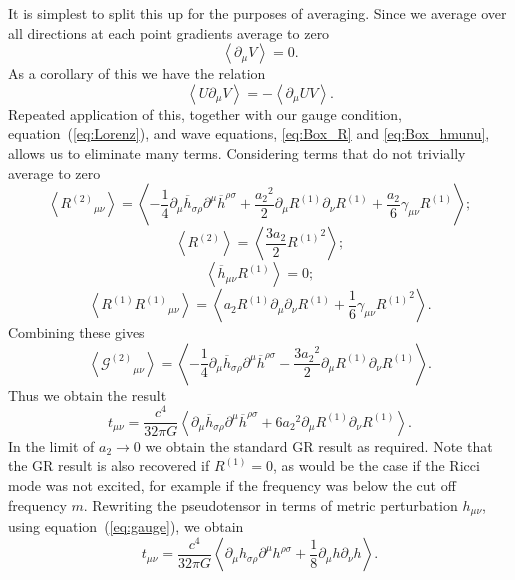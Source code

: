 \documentclass[a4paper, 11pt, titlepage, twoside]{report}
\newcommand{\eqnref}[1]{equation~(\ref{eq:#1})}
\newcommand{\recip}[1]{\ensuremath{\frac{1}{#1}}}
\begin{document}
{It is simplest to split this up for the purposes of averaging. Since we average over all directions at each point gradients average to zero
\begin{equation}
\left\langle\partial_\mu V\right\rangle = 0.
\end{equation}
As a corollary of this we have the relation
\begin{equation}
\left\langle U\partial_\mu V\right\rangle = -\left\langle \partial_\mu U V\right\rangle.
\end{equation}
Repeated application of this, together with our gauge condition, \eqnref{Lorenz}, and wave equations, \eqref{eq:Box_R} and \eqref{eq:Box_hmunu}, allows us to eliminate many terms. Considering terms that do not trivially average to zero
\begin{equation}
\left\langle {R^{(2)}}_{\mu\nu} \right\rangle = \left\langle -\recip{4} \partial_\mu\overline{h}_{\sigma\rho}\partial^\mu\overline{h}^{\rho\sigma} + \frac{{a_2}^2}{2}\partial_\mu R^{(1)}\partial_\nu R^{(1)} + \frac{a_2}{6}\gamma_{\mu\nu}R^{(1)} \right\rangle;
\end{equation}
\begin{equation}
\left\langle R^{(2)} \right\rangle = \left\langle \frac{3a_2}{2}{R^{(1)}}^2 \right\rangle;
\end{equation}
\begin{equation}
\left\langle \overline{h}_{\mu\nu}R^{(1)} \right\rangle = 0;
\end{equation}
\begin{equation}
\left\langle R^{(1)}{R^{(1)}}_{\mu\nu} \right\rangle = \left\langle a_2 R^{(1)} \partial_\mu\partial_\nu R^{(1)} + \recip{6}\gamma_{\mu\nu}{R^{(1)}}^2\right\rangle.
\end{equation}
Combining these gives
\begin{equation}
\left\langle {\mathcal{G}^{(2)}}_{\mu\nu}\right\rangle = \left\langle -\recip{4} \partial_\mu\overline{h}_{\sigma\rho}\partial^\mu\overline{h}^{\rho\sigma} - \frac{3{a_2}^2}{2}\partial_\mu R^{(1)}\partial_\nu R^{(1)} \right\rangle.
\end{equation}
Thus we obtain the result
\begin{equation}
t_{\mu\nu} = \frac{c^4}{32\pi G}\left\langle \partial_\mu\overline{h}_{\sigma\rho}\partial^\mu\overline{h}^{\rho\sigma} + 6{a_2}^2\partial_\mu R^{(1)}\partial_\nu R^{(1)} \right\rangle.
\end{equation}
In the limit of $a_2 \rightarrow 0$ we obtain the standard GR result as required. Note that the GR result is also recovered if $R^{(1)} = 0$, as would be the case if the Ricci mode was not excited, for example if the frequency was below the cut off frequency $m$. Rewriting the pseudotensor in terms of metric perturbation $h_{\mu\nu}$, using \eqnref{gauge}, we obtain
\begin{equation}
t_{\mu\nu} = \frac{c^4}{32\pi G}\left\langle \partial_\mu h_{\sigma\rho}\partial^\mu h^{\rho\sigma} + \recip{8}\partial_\mu h \partial_\nu h \right\rangle.
\end{equation}

}
\end{document}
